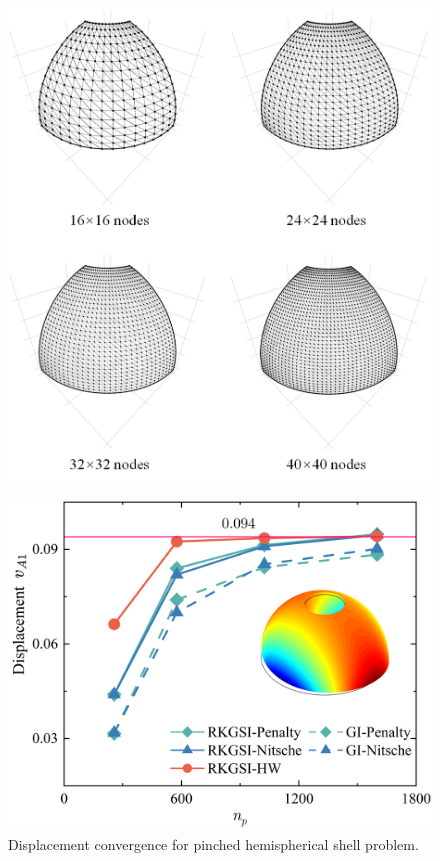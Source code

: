 \begin{figure}[!ht]
\centering
\DIFdelbeginFL %
\DIFdelendFL \DIFaddbeginFL \includegraphics[width=\textwidth]{figures/pfmsh_r1}
\caption{}\label{phfm}
\end{figure}
\begin{figure}[!ht]
\centering
\DIFdelbeginFL %
\DIFdelendFL \DIFaddbeginFL \includegraphics[width=\textwidth]{figures/pfd_r1}
\DIFaddendFL \caption{Displacement convergence for pinched hemispherical shell problem.}\label{phf2}
\end{figure}

